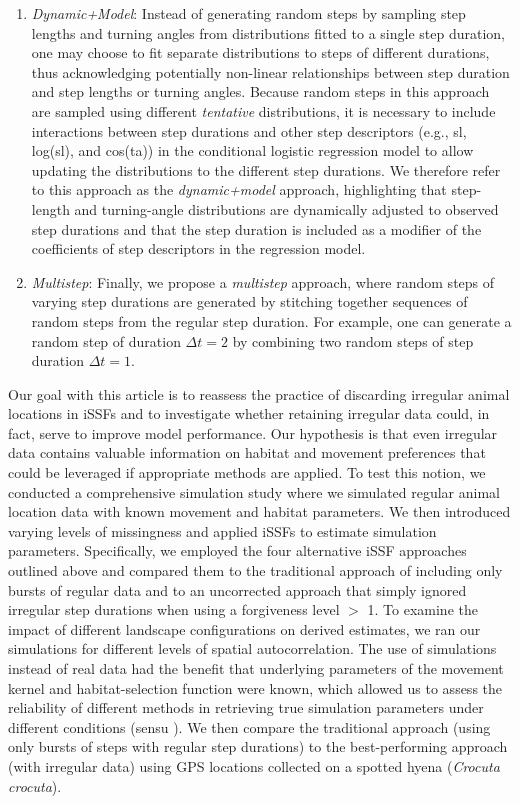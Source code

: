 \documentclass[../FinalThesis.tex]{subfiles}
\begin{document}
\begin{enumerate}
  \item \textit{Dynamic+Model}: Instead of generating random steps by sampling
  step lengths and turning angles from distributions fitted to a single
  step duration, one may choose to fit separate distributions to steps of
  different durations, thus acknowledging potentially non-linear relationships
  between step duration and step lengths or turning angles. Because random steps
  in this approach are sampled using different \textit{tentative} distributions,
  it is necessary to include interactions between step durations and other
  step descriptors (e.g., sl, log(sl), and cos(ta)) in the conditional logistic
  regression model to allow updating the distributions to the different
  step durations. We therefore refer to this approach as the
  \textit{dynamic+model} approach, highlighting that step-length and
  turning-angle distributions are dynamically adjusted to observed
  step durations and that the step duration is included as a modifier of the
  coefficients of step descriptors in the regression model.

  \item \textit{Multistep}: Finally, we propose a \textit{multistep} approach,
  where random steps of varying step durations are generated by stitching
  together sequences of random steps from the regular step duration. For
  example, one can generate a random step of duration $\Delta t = 2$ by
  combining two random steps of step duration $\Delta t = 1$.

\end{enumerate}

\noindent Our goal with this article is to reassess the practice of discarding
irregular animal locations in iSSFs and to investigate whether retaining
irregular data could, in fact, serve to improve model performance. Our
hypothesis is that even irregular data contains valuable information on habitat
and movement preferences that could be leveraged if appropriate methods are
applied. To test this notion, we conducted a comprehensive simulation study
where we simulated regular animal location data with known movement and habitat
parameters. We then introduced varying levels of missingness and applied iSSFs
to estimate simulation parameters. Specifically, we employed the four
alternative iSSF approaches outlined above and compared them to the traditional
approach of including only bursts of regular data and to an uncorrected approach
that simply ignored irregular step durations when using a forgiveness level $>$
1. To examine the impact of different landscape configurations on derived
estimates, we ran our simulations for different levels of spatial
autocorrelation. The use of simulations instead of real data had the benefit
that underlying parameters of the movement kernel and habitat-selection function
were known, which allowed us to assess the reliability of different methods in
retrieving true simulation parameters under different conditions (sensu
\citealp{Kery.2016}). We then compare the traditional approach (using only
bursts of steps with regular step durations) to the best-performing approach
(with irregular data) using GPS locations collected on a spotted hyena
(\textit{Crocuta crocuta}).
\end{document}
